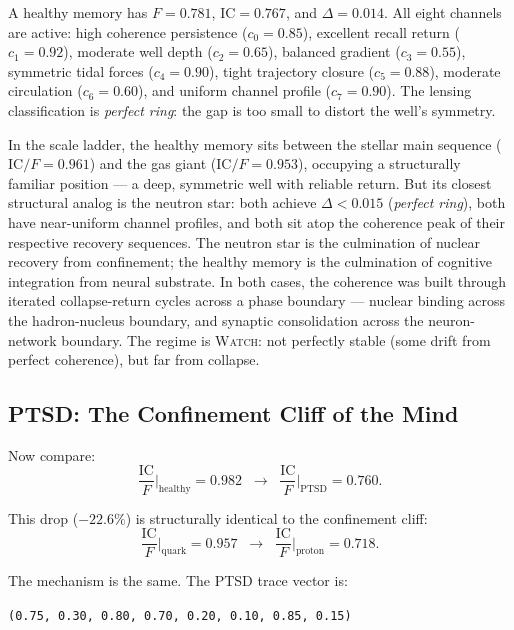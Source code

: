 \documentclass[
  aps,
  prd,
  twocolumn,
  superscriptaddress,
  nofootinbib,
  floatfix
]{revtex4-2}
\newcommand{\beq}{\begin{equation}}
\newcommand{\eeq}{\end{equation}}
\newcommand{\regime}[1]{\textsc{#1}}
\newcommand{\IC}{\mathrm{IC}}
\begin{document}
A healthy memory has $F = 0.781$, $\IC = 0.767$, and
$\Delta = 0.014$.  All eight channels are active: high
coherence persistence ($c_0 = 0.85$), excellent recall return
($c_1 = 0.92$), moderate well depth ($c_2 = 0.65$), balanced
gradient ($c_3 = 0.55$), symmetric tidal forces
($c_4 = 0.90$), tight trajectory closure ($c_5 = 0.88$),
moderate circulation ($c_6 = 0.60$), and uniform channel
profile ($c_7 = 0.90$).  The lensing classification is
\emph{perfect ring}: the gap is too small to distort the
well's symmetry.

In the scale ladder, the healthy memory sits between the
stellar main sequence ($\IC/F = 0.961$) and the gas giant
($\IC/F = 0.953$), occupying a structurally familiar
position --- a deep, symmetric well with reliable return.
But its closest structural analog is the neutron star:
both achieve $\Delta < 0.015$ (\emph{perfect ring}), both
have near-uniform channel profiles, and both sit atop the
coherence peak of their respective recovery sequences.
The neutron star is the culmination of nuclear recovery
from confinement; the healthy memory is the culmination of
cognitive integration from neural substrate.  In both cases,
the coherence was built through iterated collapse-return
cycles across a phase boundary --- nuclear binding across
the hadron-nucleus boundary, and synaptic consolidation
across the neuron-network boundary.
The regime is \regime{Watch}: not perfectly stable (some
drift from perfect coherence), but far from collapse.


\subsection{PTSD: The Confinement Cliff of the Mind}

Now compare:
\beq\label{eq:ptsd_cliff}
  \frac{\IC}{F}\bigg|_{\text{healthy}} = 0.982
  \;\;\longrightarrow\;\;
  \frac{\IC}{F}\bigg|_{\text{PTSD}} = 0.760.
\eeq

This drop ($-22.6\%$) is structurally identical to the
confinement cliff:
\beq\label{eq:quark_cliff}
  \frac{\IC}{F}\bigg|_{\text{quark}} = 0.957
  \;\;\longrightarrow\;\;
  \frac{\IC}{F}\bigg|_{\text{proton}} = 0.718.
\eeq

The mechanism is the same.  The PTSD trace vector is:
\begin{center}
\texttt{(0.75, 0.30, 0.80, 0.70, 0.20, 0.10, 0.85, 0.15)}
\end{center}
\end{document}
